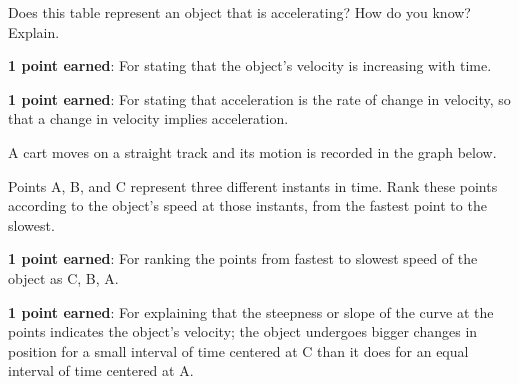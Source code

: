 \documentclass[answers]{exam}
\begin{document}
\begin{questions}
Does this table represent an object that is accelerating? How do you know? Explain.

\fillwithlines{3cm}

\begin{solutionorbox}
\phantom{.}

\textbf{1 point earned}: For stating that the object's velocity is increasing with time.

\textbf{1 point earned}: For stating that acceleration is the rate of change in velocity, so that a change in velocity implies acceleration.
\end{solutionorbox}

\question [2]
A cart moves on a straight track and its motion is recorded in the graph below.

\begin{center}
\end{center}

Points A, B, and C represent three different instants in time. Rank these points according to the object's speed at those instants, from the fastest point to the slowest.

\begin{solutionorbox}[6cm]
\phantom{.}

\textbf{1 point earned}: For ranking the points from fastest to slowest speed of the object as C, B, A. 

\textbf{1 point earned}: For explaining that the steepness or slope of the curve at the points indicates the object's velocity; the object undergoes bigger changes in position for a small interval of time centered at C than it does for an equal interval of time centered at A.
\end{solutionorbox}

\ifprintanswers
\clearpage

{\large
\printkeytable
}
\fi
\end{questions}
\end{document}
